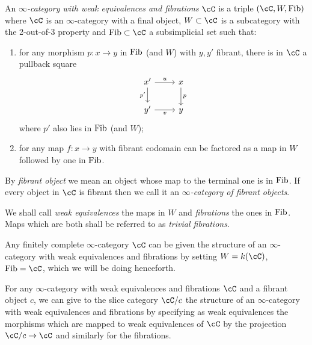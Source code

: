 \begin{defn}\label{fibicat}
  An \emph{$\infty$-category with weak equivalences and fibrations} $\cC$ is a
  triple
  $(\cC,W,\fib)$ where $\cC$ is an $\infty$-category with a final object,
  $W\subset\cC$ is a subcategory with the 2-out-of-3 property and
  $\fib\subset\cC$ a subsimplicial set such that:
  \begin{enumerate}
    \item for any morphism $p\colon x\rightarrow y$ in $\operatorname{Fib}$ (and $W$) with
      $y,y'$ fibrant, there is in $\cC$ a pullback square
      \[\begin{tikzcd}
        {x'} & x \\
        {y'} & y
        \arrow["p", from=1-2, to=2-2]
        \arrow["{p'}"', from=1-1, to=2-1]
        \arrow["v"', from=2-1, to=2-2]
        \arrow["u", from=1-1, to=1-2]
      \end{tikzcd}\]
      where $p'$ also lies in $\operatorname{Fib}$ (and $W$);
    \item for any map $f\colon x\rightarrow y$ with fibrant codomain can be
      factored as a map in $W$ followed by one in $\operatorname{Fib}$.
  \end{enumerate}
  By \emph{fibrant object} we mean an object whose map to the terminal one is in
  $\operatorname{Fib}$. If every object in $\cC$ is fibrant then we call it an
  \emph{$\infty$-category of fibrant objects}.

  \noindent
  We shall call \emph{weak equivalences} the maps in $W$ and \emph{fibrations}
  the ones in $\operatorname{Fib}$. Maps which are both shall be referred to as \emph{trivial
  fibrations}.
\end{defn}

\begin{construction}\label{fincomplarefib}
  Any finitely complete $\infty$-category $\cC$ can be given the structure of an
  $\infty$-category with weak equivalences and fibrations by setting $W=k(\cC)$,
  $\fib=\cC$, which we will be doing henceforth.
\end{construction}

\begin{construction}
  For any $\infty$-category with weak equivalences and fibrations $\cC$ and a
  fibrant object $c$, we can give to the slice category $\cC/c$ the structure of an
  $\infty$-category with weak equivalences and fibrations by specifying as weak
  equivalences the morphisms which are mapped to weak equivalences of $\cC$ by
  the projection $\cC/c\rightarrow\cC$ and similarly for the fibrations.
\end{construction}

